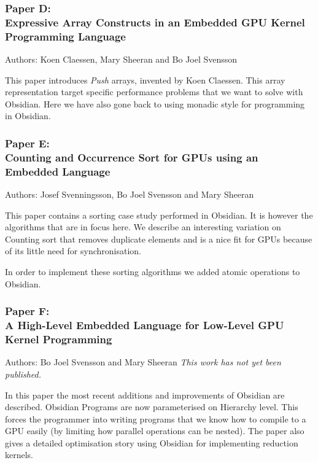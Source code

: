\documentclass[a4paper]{book}
\newcommand{\paperD}{Paper D}
\newcommand{\paperDTitle}{Expressive Array Constructs in an Embedded GPU Kernel Programming Language}
\newcommand{\paperE}{Paper E}
\newcommand{\paperETitle}{Counting and Occurrence Sort for GPUs using an Embedded Language}
\newcommand{\paperF}{Paper F}
\newcommand{\paperFTitle}{A High-Level Embedded Language for Low-Level GPU Kernel Programming}
\begin{document}
\subsubsection{\paperD: \\ \paperDTitle}

Authors: Koen Claessen, Mary Sheeran and  Bo Joel Svensson \newline

\vspace{5mm}

This paper introduces {\em Push} arrays, invented by Koen Claessen. This 
array representation target specific performance problems that we want 
to solve with Obsidian. Here we have also gone back to using monadic 
style for programming in Obsidian. 


\subsubsection{\paperE: \\ \paperETitle} 

Authors: Josef Svenningsson, Bo Joel Svensson and Mary Sheeran \newline

\vspace{5mm}

This paper contains a sorting case study performed in Obsidian. It 
is however the algorithms that are in focus here. We describe 
an interesting variation on Counting sort that removes duplicate 
elements and is a nice fit for GPUs because of its little need for 
synchronisation. 

In order to implement these sorting algorithms we added atomic operations 
to Obsidian. 

\subsubsection{\paperF: \\ \paperFTitle}

Authors: Bo Joel Svensson and Mary Sheeran \newline
\noindent \emph{This work has not yet been published.}
\vspace{5mm} 

\noindent 

In this paper the most recent additions and improvements of Obsidian are 
described. Obsidian Programs are now parameterised on Hierarchy level. This forces
the programmer into writing programs that we know how to compile to a GPU easily 
(by limiting how parallel operations can be nested). The paper also gives a detailed  
optimisation story using Obsidian for implementing reduction kernels. 
\end{document}
